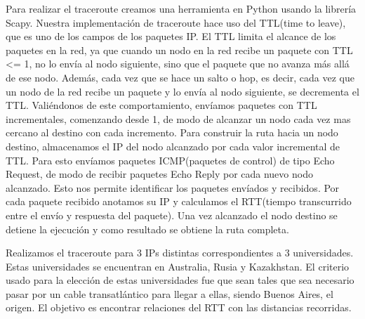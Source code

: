 Para realizar el traceroute creamos una herramienta en Python usando la librería Scapy. 
Nuestra implementación de traceroute hace uso del TTL(time to leave), que es uno de los campos de los paquetes IP. El TTL limita el alcance de los paquetes en la red, ya que cuando un nodo en la red recibe un paquete con TTL <= 1, no lo envía al nodo siguiente, sino que el paquete que no avanza más allá de ese nodo. Además, cada vez que se hace un salto o hop, es decir, cada vez que un nodo de la red recibe un paquete y lo envía al nodo siguiente, se decrementa el TTL. Valiéndonos de este comportamiento, envíamos paquetes con TTL incrementales, comenzando desde 1, de modo de alcanzar un nodo cada vez mas cercano al destino con cada incremento.
Para construir la ruta hacia un nodo destino, almacenamos el IP del nodo alcanzado por cada valor incremental de TTL. Para esto envíamos paquetes ICMP(paquetes de control) de tipo Echo Request, de modo de recibir paquetes Echo Reply por cada nuevo nodo alcanzado. Esto nos permite identificar los paquetes envíados y recibidos. Por cada paquete recibido anotamos su IP y calculamos el RTT(tiempo transcurrido entre el envío y respuesta del paquete).
Una vez alcanzado el nodo destino se detiene la ejecución y como resultado se obtiene la ruta completa.

Realizamos el traceroute para 3 IPs distintas correspondientes a 3 universidades. Estas universidades se encuentran en Australia, Rusia y Kazakhstan. El criterio usado para la elección de estas universidades fue que sean tales que sea necesario pasar por un cable transatlántico para llegar a ellas, siendo Buenos Aires, el origen. El objetivo es encontrar relaciones del RTT con las distancias recorridas.